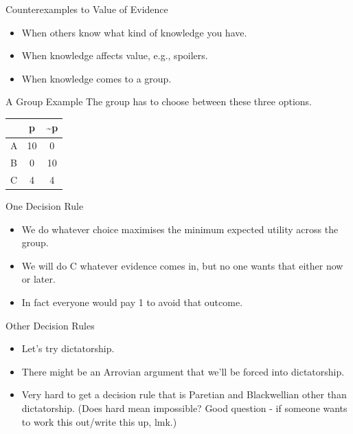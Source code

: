 \documentclass[
  ignorenonframetext,
]{beamer}
\providecommand{\tightlist}{%
  \setlength{\itemsep}{0pt}\setlength{\parskip}{0pt}}
\begin{document}
\begin{frame}{Counterexamples to Value of Evidence}
\protect\hypertarget{counterexamples-to-value-of-evidence}{}
\begin{itemize}[<+->]
\tightlist
\item
  When others know what kind of knowledge you have.
\item
  When knowledge affects value, e.g., spoilers.
\item
  When knowledge comes to a group.
\end{itemize}
\end{frame}

\begin{frame}{A Group Example}
\protect\hypertarget{a-group-example}{}
The group has to choose between these three options.

\begin{longtable}[]{@{}lcc@{}}
\toprule
& p & \textasciitilde p \\
\midrule
\endhead
A & 10 & 0 \\
B & 0 & 10 \\
C & 4 & 4 \\
\bottomrule
\end{longtable}
\end{frame}

\begin{frame}{One Decision Rule}
\protect\hypertarget{one-decision-rule}{}
\begin{itemize}[<+->]
\tightlist
\item
  We do whatever choice maximises the minimum expected utility across
  the group.
\item
  We will do C whatever evidence comes in, but no one wants that either
  now or later.
\item
  In fact everyone would pay 1 to avoid that outcome.
\end{itemize}
\end{frame}

\begin{frame}{Other Decision Rules}
\protect\hypertarget{other-decision-rules}{}
\begin{itemize}
\tightlist
\item
  Let's try dictatorship.
\item
  There might be an Arrovian argument that we'll be forced into
  dictatorship.
\item
  Very hard to get a decision rule that is Paretian and Blackwellian
  other than dictatorship. (Does hard mean impossible? Good question -
  if someone wants to work this out/write this up, lmk.)
\end{itemize}
\end{frame}
\end{document}
